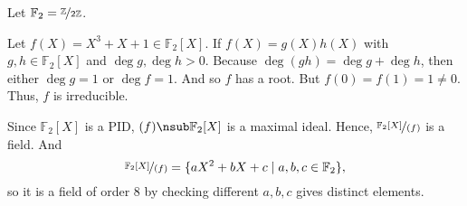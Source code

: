 \begin{example}[Field of 8]
    Let \(\mathbb{F}_2 = \nicefrac{\mathbb{Z}}{2\mathbb{Z}}\).

    Let \(f(X) = X^3 + X + 1 \in \mathbb{F}_2[X]\). If \(f(X) = g(X)h(X)\) with \(g, h \in \mathbb{F}_2[X]\) and \(\deg g, \deg h > 0\). Because \(\deg(gh) = \deg g + \deg h\), then either \(\deg g = 1\) or \(\deg f = 1\). And so \(f\) has a root. But \(f(0) = f(1) = 1 \neq 0\). Thus, \(f\) is irreducible.

    Since \(\mathbb{F}_2[X]\) is a PID, \((f) \nsub \mathbb{F}_2[X]\) is a maximal ideal. Hence, \(\nicefrac{\mathbb{F}_2[X]}{(f)}\) is a field. And
    \[
        \nicefrac{\mathbb{F}_2[X]}{(f)} = \{aX^2 + bX + c \mid a,b,c \in \mathbb{F}_2\},
    \]
    so it is a field of order 8 by checking different \(a,b,c\) gives distinct elements.
\end{example}